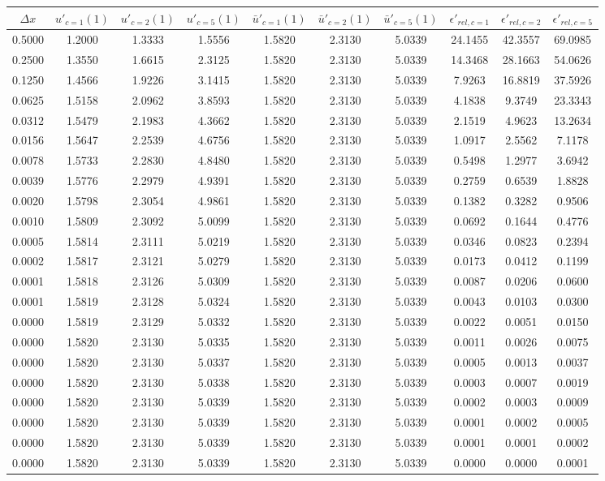\begin{tabular}{|c|c|c|c|c|c|c|c|c|c|}
\hline
\textbf{$\Delta x$}&\textbf{$u'_{c=1}(1)$}&\textbf{$u'_{c=2}(1)$}&\textbf{$u'_{c=5}(1)$}&\textbf{$\bar{u}'_{c=1}(1)$}&\textbf{$\bar{u}'_{c=2}(1)$}&\textbf{$\bar{u}'_{c=5}(1)$}&\textbf{$\epsilon'_{rel,c=1}$}&\textbf{$\epsilon'_{rel,c=2}$}&\textbf{$\epsilon'_{rel,c=5}$}\\\hline
0.5000&1.2000&1.3333&1.5556&1.5820&2.3130&5.0339&24.1455&42.3557&69.0985\\\hline
0.2500&1.3550&1.6615&2.3125&1.5820&2.3130&5.0339&14.3468&28.1663&54.0626\\\hline
0.1250&1.4566&1.9226&3.1415&1.5820&2.3130&5.0339&7.9263&16.8819&37.5926\\\hline
0.0625&1.5158&2.0962&3.8593&1.5820&2.3130&5.0339&4.1838&9.3749&23.3343\\\hline
0.0312&1.5479&2.1983&4.3662&1.5820&2.3130&5.0339&2.1519&4.9623&13.2634\\\hline
0.0156&1.5647&2.2539&4.6756&1.5820&2.3130&5.0339&1.0917&2.5562&7.1178\\\hline
0.0078&1.5733&2.2830&4.8480&1.5820&2.3130&5.0339&0.5498&1.2977&3.6942\\\hline
0.0039&1.5776&2.2979&4.9391&1.5820&2.3130&5.0339&0.2759&0.6539&1.8828\\\hline
0.0020&1.5798&2.3054&4.9861&1.5820&2.3130&5.0339&0.1382&0.3282&0.9506\\\hline
0.0010&1.5809&2.3092&5.0099&1.5820&2.3130&5.0339&0.0692&0.1644&0.4776\\\hline
0.0005&1.5814&2.3111&5.0219&1.5820&2.3130&5.0339&0.0346&0.0823&0.2394\\\hline
0.0002&1.5817&2.3121&5.0279&1.5820&2.3130&5.0339&0.0173&0.0412&0.1199\\\hline
0.0001&1.5818&2.3126&5.0309&1.5820&2.3130&5.0339&0.0087&0.0206&0.0600\\\hline
0.0001&1.5819&2.3128&5.0324&1.5820&2.3130&5.0339&0.0043&0.0103&0.0300\\\hline
0.0000&1.5819&2.3129&5.0332&1.5820&2.3130&5.0339&0.0022&0.0051&0.0150\\\hline
0.0000&1.5820&2.3130&5.0335&1.5820&2.3130&5.0339&0.0011&0.0026&0.0075\\\hline
0.0000&1.5820&2.3130&5.0337&1.5820&2.3130&5.0339&0.0005&0.0013&0.0037\\\hline
0.0000&1.5820&2.3130&5.0338&1.5820&2.3130&5.0339&0.0003&0.0007&0.0019\\\hline
0.0000&1.5820&2.3130&5.0339&1.5820&2.3130&5.0339&0.0002&0.0003&0.0009\\\hline
0.0000&1.5820&2.3130&5.0339&1.5820&2.3130&5.0339&0.0001&0.0002&0.0005\\\hline
0.0000&1.5820&2.3130&5.0339&1.5820&2.3130&5.0339&0.0001&0.0001&0.0002\\\hline
0.0000&1.5820&2.3130&5.0339&1.5820&2.3130&5.0339&0.0000&0.0000&0.0001\\\hline
\end{tabular}
